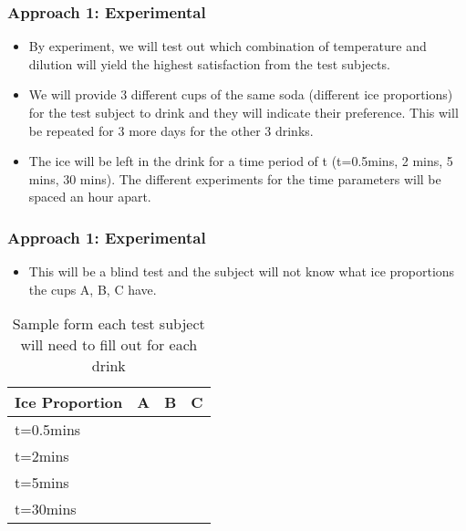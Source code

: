 \documentclass[compress,handout,10pt]{beamer}
\let\olditem\item
\renewcommand{\item}{\setlength{\itemsep}{0.5\baselineskip}\olditem}
\begin{document}
\begin{frame}
    \frametitle{Approach 1: Experimental}

\begin {itemize}
\item By experiment, we will test out which combination of temperature and dilution will yield the highest satisfaction from the test subjects.
\item We will provide 3 different cups of the same soda (different ice proportions) for the test subject to drink and they will indicate their preference. This will be repeated for 3 more days for the other 3 drinks.
\item The ice will be left in the drink for a time period of t (t=0.5mins, 2 mins, 5 mins, 30 mins). The different experiments for the time parameters will be spaced an hour apart.
\end{itemize}
\end{frame}

\begin{frame}
    \frametitle{Approach 1: Experimental}

\begin {itemize}

\item This will be a blind test and the subject will not know what ice proportions the cups A, B, C have.
\end{itemize}
\vspace{6pt}

\begin{table}[ h]
\centering
\begin{tabular}{ l | c|c|c }
  Ice Proportion & A  & B & C  \\
\hline  
t=0.5mins & & &\\ 
\hline  
t=2mins & & &\\ 
\hline  
t=5mins  & & &\\ 
\hline  
t=30mins & & &\\ 
\hline  
   
 \end{tabular}
\caption{Sample form each test subject will need to fill out for each drink}

\end{table}

\end{frame}
\end{document}
